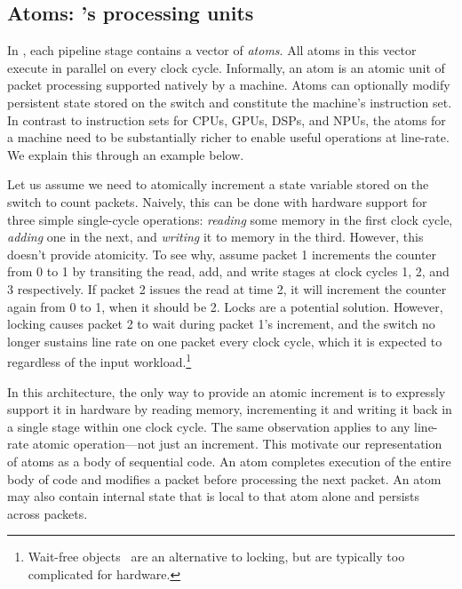 \subsection{Atoms: \absmachine's processing units}
\label{ss:atoms}

In \absmachine, each pipeline stage contains a vector of
\textit{atoms}. All atoms in this vector execute in parallel on every
clock cycle.  Informally, an atom is an atomic unit of packet processing
supported natively by a \absmachine machine. Atoms can optionally
modify persistent state stored on the switch and constitute the
machine's instruction set.  In contrast to instruction sets for CPUs,
GPUs, DSPs, and NPUs, the atoms for a \absmachine machine need to be
substantially richer to enable useful operations at line-rate. We
explain this through an example below.

Let us assume we need to atomically increment a state variable stored
on the switch to count packets. Naively, this can be done with
hardware support for three simple single-cycle operations: \textit{reading} some
memory in the first clock cycle, \textit{adding} one in the next, and
\textit{writing} it to memory in the third. However, this doesn't
provide atomicity. To see why, assume packet 1 increments the counter
from 0 to 1 by transiting the read, add, and write stages at clock cycles 1,
2, and 3 respectively.  If packet 2 issues the read at time
2, it will increment the counter again from 0 to 1, when it should be
2. Locks are a potential solution. However, locking causes
packet 2 to wait during packet 1's increment, and the switch no longer
sustains line rate on one packet every clock cycle, which it is expected to
regardless of the input workload.\footnote{Wait-free objects~\cite{herlihy_wait} are an
  alternative to locking, but are typically too complicated for
  hardware.}

In this architecture, the only way to provide an atomic increment is
to expressly support it in hardware by reading memory, incrementing it
and writing it back in a single stage within one clock cycle. The same
observation applies to any line-rate atomic operation---not just an
increment.  This motivate our representation of atoms as a body of
sequential code. An atom completes execution of the entire body of
code and modifies a packet before processing the next packet.  An atom
may also contain internal state that is local to that atom alone and
persists across packets.

